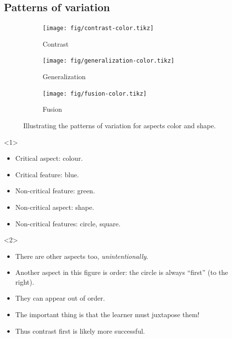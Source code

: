 \subsection{Patterns of variation}

\begin{frame}
  \begin{figure}
    \begin{subfigure}{0.3\columnwidth}
      \centering
      \texttt{[image: fig/contrast-color.tikz]}
      \caption{Contrast}
    \end{subfigure}
    \hfill
    \begin{subfigure}{0.3\columnwidth}
      \centering
      \texttt{[image: fig/generalization-color.tikz]}
      \caption{Generalization}
    \end{subfigure}
    \hfill
    \begin{subfigure}{0.3\columnwidth}
      \centering
      \texttt{[image: fig/fusion-color.tikz]}
      \caption{Fusion}
    \end{subfigure}
    \caption{%
      Illustrating the patterns of variation for aspects color and shape.
    }
  \end{figure}

  \begin{onlyenv}<1>
    \begin{example}
      \begin{itemize}
        \item Critical aspect: colour.
        \item Critical feature: blue.
        \item Non-critical feature: green.
        \item Non-critical aspect: shape.
        \item Non-critical features: circle, square.
      \end{itemize}
    \end{example}
  \end{onlyenv}
  \begin{onlyenv}<2>
    \begin{remark}
      \begin{itemize}
        \item There are other aspects too, \emph{unintentionally}.
        \item Another aspect in this figure is order: the circle is always 
          \enquote{first} (to the right).
      \end{itemize}
    \end{remark}
  \end{onlyenv}
\end{frame}

\begin{frame}
  \begin{remark}
    \begin{itemize}
      \item They can appear out of order.
      \item The important thing is that the learner must juxtapose them!
      \item Thus contrast first is likely more successful.
    \end{itemize}
  \end{remark}
\end{frame}

